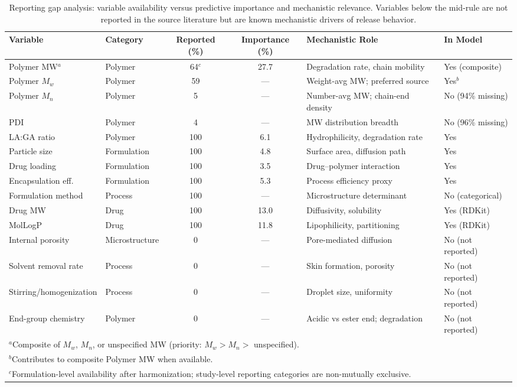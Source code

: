 \begin{table}[H]
\centering
\caption{Reporting gap analysis: variable availability versus predictive importance and mechanistic relevance. Variables below the mid-rule are not reported in the source literature but are known mechanistic drivers of release behavior.}
\label{tab:reporting_gaps}
\small
\begin{tabular}{llccll}
\toprule
Variable & Category & Reported (\%) & Importance (\%) & Mechanistic Role & In Model \\
\midrule
Polymer MW$^{a}$ & Polymer & 64$^{c}$ & 27.7 & Degradation rate, chain mobility & Yes (composite) \\
Polymer $M_w$ & Polymer & 59 & --- & Weight-avg MW; preferred source & Yes$^{b}$ \\
Polymer $M_n$ & Polymer & 5 & --- & Number-avg MW; chain-end density & No (94\% missing) \\
PDI & Polymer & 4 & --- & MW distribution breadth & No (96\% missing) \\
LA:GA ratio & Polymer & 100 & 6.1 & Hydrophilicity, degradation rate & Yes \\
Particle size & Formulation & 100 & 4.8 & Surface area, diffusion path & Yes \\
Drug loading & Formulation & 100 & 3.5 & Drug--polymer interaction & Yes \\
Encapsulation eff. & Formulation & 100 & 5.3 & Process efficiency proxy & Yes \\
Formulation method & Process & 100 & --- & Microstructure determinant & No (categorical) \\
Drug MW & Drug & 100 & 13.0 & Diffusivity, solubility & Yes (RDKit) \\
MolLogP & Drug & 100 & 11.8 & Lipophilicity, partitioning & Yes (RDKit) \\
\midrule
Internal porosity & Microstructure & 0 & --- & Pore-mediated diffusion & No (not reported) \\
Solvent removal rate & Process & 0 & --- & Skin formation, porosity & No (not reported) \\
Stirring/homogenization & Process & 0 & --- & Droplet size, uniformity & No (not reported) \\
End-group chemistry & Polymer & 0 & --- & Acidic vs ester end; degradation & No (not reported) \\
\bottomrule
\multicolumn{6}{l}{\footnotesize $^{a}$Composite of $M_w$, $M_n$, or unspecified MW (priority: $M_w > M_n >$ unspecified).} \\
\multicolumn{6}{l}{\footnotesize $^{b}$Contributes to composite Polymer MW when available.} \\
\multicolumn{6}{l}{\footnotesize $^{c}$Formulation-level availability after harmonization; study-level reporting categories are non-mutually exclusive.} \\
\end{tabular}
\end{table}

